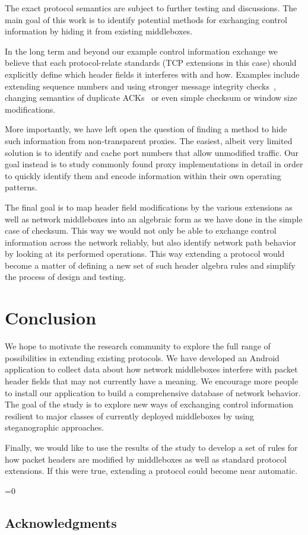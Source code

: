 \documentclass{sig-alternate-10pt}
\def\anon{1}        %
\begin{document}
The exact protocol semantics are subject to further testing and discussions. The main goal of this work is to identify potential methods for exchanging control information by hiding it from existing middleboxes.

In the long term and beyond our example control information exchange we believe that each protocol-relate standards (TCP extensions in this case) should explicitly define which header fields it interferes with and how. Examples include extending sequence numbers and using stronger message integrity checks~\cite{Mazieres:uz}, changing semantics of duplicate ACKs~\cite{Handley:vj,Flach:2013uy} or even simple checksum or window size modifications.

More importantly, we have left open the question of finding a method to hide such information from non-transparent proxies. The easiest, albeit very limited solution is to identify and cache port numbers that allow unmodified traffic. Our goal instead is to study commonly found proxy implementations in detail in order to quickly identify them and encode information within their own operating patterns.

The final goal is to map header field modifications by the various extensions as well as network middleboxes into an algebraic form as we have done in the simple case of checksum. This way we would not only be able to exchange control information across the network reliably, but also identify network path behavior by looking at its performed operations. This way extending a protocol would become a matter of defining a new set of such header algebra rules and simplify the process of design and testing.

\section{Conclusion}

We hope to motivate the research community to explore the full range of possibilities in extending existing protocols. We have developed an Android application to collect data about how network middleboxes interfere with packet header fields that may not currently have a meaning. We encourage more people to install our application to build a comprehensive database of network behavior. The goal of the study is to explore new ways of exchanging control information resilient to major classes of currently deployed middleboxes by using steganographic approaches. 

Finally, we would like to use the results of the study to develop a set of rules for how packet headers are modified by middleboxes as well as standard protocol extensions. If this were true, extending a protocol could become near automatic.

\ifnum\anon=0
\subsection*{Acknowledgments}

\fi


\clearpage
{


\small 

}

%
\end{document}
